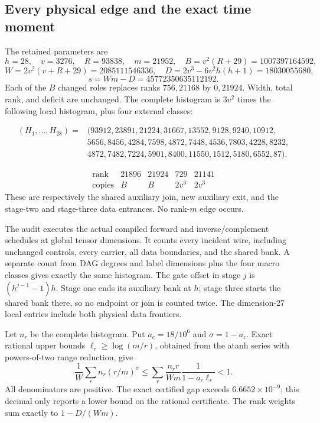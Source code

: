 \subsection{Every physical edge and the exact time moment}
\label{sec:translated-complex-edges}
The retained parameters are
\[
 h=28,\quad v=3276,\quad R=93838,\quad m=21952,
 \quad B=v^2(R+29)=1007397164592,
\]
\[
 W=2v^2(v+R+29)=2085111546336,\quad
 D=2v^3-6v^2h(h+1)=18030055680,
\]
\[
 s=Wm-D=45772350635112192.
\]
Each of the $B$ changed roles replaces ranks $756,21168$ by $0,21924$.
Width, total rank, and deficit are unchanged. The complete histogram is
$3v^2$ times the following local histogram, plus four external classes:
\begin{small}\[
\begin{split}
(H_1,\ldots,H_{28})={}&(93912,23891,21224,31667,13552,9128,9240,10912,\\
 &5656,8456,4284,7598,4872,7448,4536,7803,4228,8232,\\
 &4872,7482,7224,5901,8400,11550,1512,5180,6552,87).
\end{split}
\]\end{small}
\[
\begin{array}{c|rrrr}
\text{rank}&21896&21924&729&21141\\\hline
\text{copies}&B&B&2v^3&2v^3
\end{array}
\]
These are respectively the shared auxiliary join, new auxiliary exit,
and the stage-two and stage-three data entrances. No rank-$m$ edge occurs.

The audit executes the actual compiled forward and inverse/complement
schedules at global tensor dimensions. It counts every incident wire,
including unchanged controls, every carrier, all data boundaries, and the
shared bank. A separate count from DAG degrees and label dimensions plus
the four macro classes gives exactly the same histogram. The gate offset
in stage $j$ is $(h^{j-1}-1)h$. Stage one ends its auxiliary bank at $h$;
stage three starts the shared bank there, so no endpoint or join is counted
twice. The dimension-27 local entries include both physical data frontiers.

Let $n_r$ be the complete histogram. Put $a_c=18/10^6$ and
$\sigma=1-a_c$. Exact rational upper bounds $\ell_r\ge\log(m/r)$,
obtained from the atanh series with powers-of-two range reduction, give
\[
 \frac1W\sum_r n_r(r/m)^\sigma
 \le\sum_r\frac{n_rr}{Wm}\frac1{1-a_c\ell_r}<1.
\]
All denominators are positive. The exact certified gap exceeds
$6.6652\times10^{-9}$; this decimal only reports a lower bound on the
rational certificate. The rank weights sum exactly to $1-D/(Wm)$.

